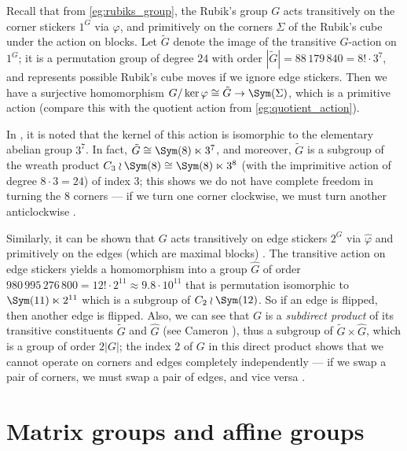 \begin{example}\label{eg:rubiks_cube_wreath}
    Recall that from \autoref{eg:rubiks_group}, the Rubik's group $G$ acts transitively on the corner stickers $1^G$ via $\varphi$, and primitively on the corners $\Sigma$ of the Rubik's cube under the action on blocks. Let $\tilde G$ denote the image of the transitive $G$-action on $1^G$; it is a permutation group of degree $24$ with order $|\tilde G| = 88\,179\,840 = 8! \cdot 3^7$, and represents possible Rubik's cube moves if we ignore edge stickers. Then we have a surjective homomorphism $G/\ker\varphi \cong \tilde G \to \Sym(\Sigma)$, which is a primitive action (compare this with the quotient action from \autoref{eg:quotient_action}).

    In \cite{schonert_GAP}, it is noted that the kernel of this action is isomorphic to the elementary abelian group $3^7$. In fact, $\tilde G \cong \Sym(8) \ltimes 3^7$, and moreover, $\tilde G$ is a subgroup of the wreath product $C_3 \wr \Sym(8) \cong \Sym(8) \ltimes 3^8$ (with the imprimitive action of degree $8 \cdot 3 = 24$) of index 3; this shows we do not have complete freedom in turning the 8 corners --- if we turn one corner clockwise, we must turn another anticlockwise \cite{schonert_GAP}.

    Similarly, it can be shown that $G$ acts transitively on edge stickers $2^G$ via $\hat\varphi$ and primitively on the edges (which are maximal blocks) \cite{schonert_GAP}. The transitive action on edge stickers yields a homomorphism into a group $\hat G$ of order $980\,995\,276\,800 = 12! \cdot 2^{11} \approx 9.8 \cdot 10^{11}$ that is permutation isomorphic to $\Sym(11) \ltimes 2^{11}$ which is a subgroup of $C_2 \wr \Sym(12)$. So if an edge is flipped, then another edge is flipped. Also, we can see that $G$ is a \textit{subdirect product} of its transitive constituents $\tilde G$ and $\hat G$ (see Cameron \cite{cameron_permutation_groups1999}), thus a subgroup of $\tilde G \times \hat G$, which is a group of order $2|G|$; the index 2 of $G$ in this direct product shows that we cannot operate on corners and edges completely independently --- if we swap a pair of corners, we must swap a pair of edges, and vice versa \cite{schonert_GAP}.
\end{example}

\section{Matrix groups and affine groups}

